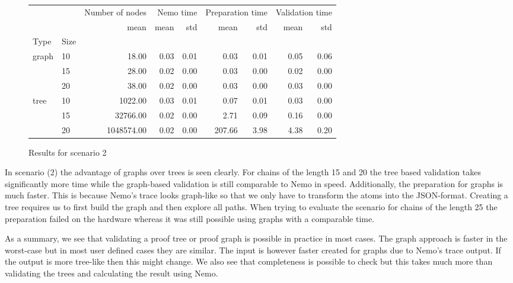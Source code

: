 \begin{figure}
\begin{tabular}{llrrrrrrr}
    &  & Number of nodes & \multicolumn{2}{r}{Nemo time} & \multicolumn{2}{r}{Preparation time} & \multicolumn{2}{r}{Validation time} \\
    &  & mean & mean & std & mean & std & mean & std \\
   Type & Size &  &  &  &  &  &  &  \\
   \multirow[c]{3}{*}{graph} & 10 & 18.00 & 0.03 & 0.01 & 0.03 & 0.01 & 0.05 & 0.06 \\
    & 15 & 28.00 & 0.02 & 0.00 & 0.03 & 0.00 & 0.02 & 0.00 \\
    & 20 & 38.00 & 0.02 & 0.00 & 0.03 & 0.00 & 0.03 & 0.00 \\
   \multirow[c]{3}{*}{tree} & 10 & 1022.00 & 0.03 & 0.01 & 0.07 & 0.01 & 0.03 & 0.00 \\
    & 15 & 32766.00 & 0.02 & 0.00 & 2.71 & 0.09 & 0.16 & 0.00 \\
    & 20 & 1048574.00 & 0.02 & 0.00 & 207.66 & 3.98 & 4.38 & 0.20 \\
\end{tabular}
\caption{Results for scenario 2}
\end{figure}

In scenario (2) the advantage of graphs over trees is seen clearly. For chains of the length 15 and 20 the tree based validation takes significantly more time while the graph-based validation is still comparable to Nemo in speed. Additionally, the preparation for graphs is much faster. This is because Nemo's trace looks graph-like so that we only have to transform the atoms into the JSON-format. Creating a tree requires us to first build the graph and then explore all paths. When trying to evaluate the scenario for chains of the length 25 the preparation failed on the hardware whereas it was still possible using graphs with a comparable time.



As a summary, we see that validating a proof tree or proof graph is possible in practice in most cases. The graph approach is faster in the worst-case but in most user defined cases they are similar. The input is however faster created for graphs due to Nemo's trace output. If the output is more tree-like then this might change. We also see that completeness is possible to check but this takes much more than validating the trees and calculating the result using Nemo.